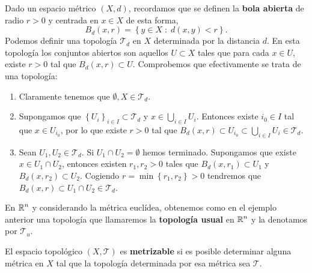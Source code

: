 \begin{eg}
Dado un espacio métrico $\displaystyle \left(X,d\right) $, recordamos que se definen la \textbf{bola abierta} de radio $\displaystyle r > 0 $ y centrada en $\displaystyle x \in X $ de esta forma,
\[ B_{d}\left(x, r\right)= \left\{ y \in X \; : \; d\left(x,y\right) < r\right\} .\]
Podemos definir una topología $\displaystyle \mathcal{T}_{d} $ en $\displaystyle X $ determinada por la distancia $\displaystyle d $. En esta topología los conjuntos abiertos son aquellos $\displaystyle U \subset X $ tales que para cada $\displaystyle x \in U $, existe $\displaystyle r > 0 $ tal que $\displaystyle B_{d}\left(x,r\right)\subset U $. Comprobemos que efectivamente se trata de una topología:
\begin{enumerate}
\item Claramente tenemos que $\displaystyle \emptyset, X \in \mathcal{T}_{d} $. 
\item Supongamos que $\displaystyle \left\{ U_{i}\right\} _{i \in I}\subset \mathcal{T}_{d} $ y $\displaystyle x \in \bigcup_{i \in I}U_{i} $. Entonces existe $\displaystyle i_{0} \in I $ tal que $\displaystyle x \in U_{i_{0}} $, por lo que existe $\displaystyle r > 0 $ tal que $\displaystyle B_{d}\left(x, r\right)\subset U_{i_{0}}\subset \bigcup_{i \in I}U_{i} \in \mathcal{T}_{d} $. 
\item Sean $\displaystyle U_{1}, U_{2} \in \mathcal{T}_{d} $. Si $\displaystyle U_{1} \cap U_{2} = \emptyset $ hemos terminado. Supongamos que existe $\displaystyle x \in U_{1} \cap U_{2} $, entonces existen $\displaystyle r_{1}, r_{2} > 0 $ tales que $\displaystyle B_{d}\left(x, r_{1}\right)\subset U_{1} $ y $\displaystyle B_{d}\left(x, r_{2}\right)\subset U_{2} $. Cogiendo $\displaystyle r = \min \left\{ r_{1}, r_{2}\right\} >0 $ tendremos que $\displaystyle B_{d}\left(x, r\right)\subset U_{1}\cap U_{2} \in \mathcal{T}_{d} $.
\end{enumerate}
\end{eg}
\begin{notation}
	En $\displaystyle \mathbb{R}^{n} $ y considerando la métrica euclídea, obtenemos como en el ejemplo anterior una topología que llamaremos la \textbf{topología usual} en $\displaystyle \mathbb{R}^{n} $ y la denotamos por $\displaystyle \mathcal{T}_{u} $.
\end{notation}
\begin{definition}
El espacio topológico $\displaystyle \left(X, \mathcal{T}\right) $ es \textbf{metrizable} si es posible determinar alguna métrica en $\displaystyle X $ tal que la topología determinada por esa métrica sea $\displaystyle \mathcal{T} $.
\end{definition}
